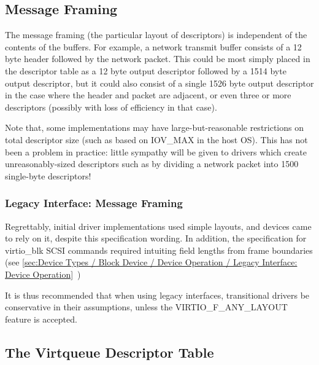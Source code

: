 \subsection{Message Framing}\label{sec:Basic Facilities of a Virtio Device / Virtqueues / Message Framing}
The message framing (the particular layout of descriptors) is
independent of the contents of the buffers. For example, a network
transmit buffer consists of a 12 byte header followed by the network
packet. This could be most simply placed in the descriptor table as a
12 byte output descriptor followed by a 1514 byte output descriptor,
but it could also consist of a single 1526 byte output descriptor in
the case where the header and packet are adjacent, or even three or
more descriptors (possibly with loss of efficiency in that case).

Note that, some implementations may have large-but-reasonable
restrictions on total descriptor size (such as based on IOV_MAX in the
host OS). This has not been a problem in practice: little sympathy
will be given to drivers which create unreasonably-sized descriptors
such as by dividing a network packet into 1500 single-byte
descriptors!

\subsubsection{Legacy Interface: Message Framing}\label{sec:Basic Facilities of a Virtio Device / Virtqueues / Message Framing / Legacy Interface: Message Framing}

Regrettably, initial driver implementations used simple layouts, and
devices came to rely on it, despite this specification wording.  In
addition, the specification for virtio_blk SCSI commands required
intuiting field lengths from frame boundaries (see
 \ref{sec:Device Types / Block Device / Device Operation / Legacy Interface: Device Operation}~)

It is thus recommended that when using legacy interfaces, transitional
drivers be conservative in their assumptions, unless the
VIRTIO_F_ANY_LAYOUT feature is accepted.

\subsection{The Virtqueue Descriptor Table}\label{sec:Basic Facilities of a Virtio Device / Virtqueues / The Virtqueue Descriptor Table}

